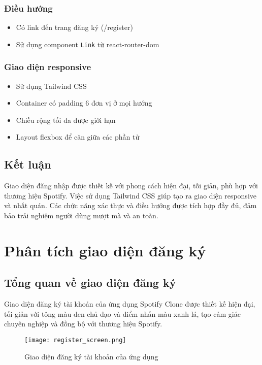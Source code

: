 \documentclass{book}
\let\oldsection\section
\renewcommand{\section}{\clearpage\oldsection}
\begin{document}
\subsubsection{Điều hướng}
\begin{itemize}
    \item Có link đến trang đăng ký (/register)
    \item Sử dụng component \texttt{Link} từ react-router-dom
\end{itemize}

\subsubsection{Giao diện responsive}
\begin{itemize}
    \item Sử dụng Tailwind CSS
    \item Container có padding 6 đơn vị ở mọi hướng
    \item Chiều rộng tối đa được giới hạn
    \item Layout flexbox để căn giữa các phần tử
\end{itemize}

\subsection{Kết luận}
Giao diện đăng nhập được thiết kế với phong cách hiện đại, tối giản, phù hợp với thương hiệu Spotify. Việc sử dụng Tailwind CSS giúp tạo ra giao diện responsive và nhất quán. Các chức năng xác thực và điều hướng được tích hợp đầy đủ, đảm bảo trải nghiệm người dùng mượt mà và an toàn.

\section{Phân tích giao diện đăng ký}

\subsection{Tổng quan về giao diện đăng ký}
Giao diện đăng ký tài khoản của ứng dụng Spotify Clone được thiết kế hiện đại, tối giản với tông màu đen chủ đạo và điểm nhấn màu xanh lá, tạo cảm giác chuyên nghiệp và đồng bộ với thương hiệu Spotify.

\begin{figure}[h!]
\centering
\texttt{[image: register\_screen.png]} %
\caption{Giao diện đăng ký tài khoản của ứng dụng}
\label{fig:register}
\end{figure}
\end{document}
